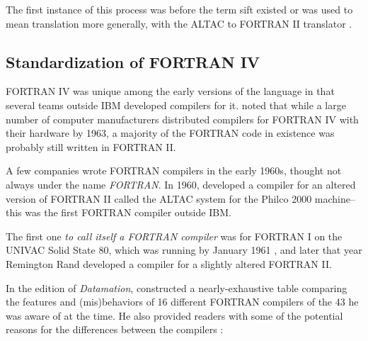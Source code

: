 The first instance of this process was before the term \gls{sift}
existed or was used to mean translation more generally, with
the ALTAC to FORTRAN II translator \cite{olsen_altac_fortranii_translator_1965}.

\subsection{Standardization of FORTRAN IV}

FORTRAN IV was unique among the early versions of the language in that
several teams outside IBM developed compilers for it.
\citeauthor{backus_heising_fortran_1964} noted that while a large number
of computer manufacturers distributed compilers for FORTRAN IV with
their hardware by 1963, a majority of the FORTRAN code in existence
was probably still written in FORTRAN II\cite{backus_heising_fortran_1964}.

A few companies wrote FORTRAN compilers in the early 1960s,
thought not always under the name \textit{FORTRAN}.
In 1960,  developed a compiler for
an altered version of FORTRAN II called the ALTAC system
for the Philco 2000 machine\cite{sammet_programming_languages_history_and_fundamentals_1969}--
this was the first FORTRAN compiler outside IBM.

The first one
\textit{to call itself a FORTRAN compiler} was for FORTRAN I
on the UNIVAC Solid State 80, which was running by January 1961
\cite{sammet_programming_languages_history_and_fundamentals_1969},
and later that year Remington Rand developed a compiler
for a slightly altered FORTRAN II.

In the  edition of \textit{Datamation},
\citeauthor{oswald_various_fortrans_datamation_1964}
constructed a nearly-exhaustive table comparing the features and (mis)behaviors of
16 different FORTRAN compilers of the 43 he was aware of at the time.
He also provided readers with some of the potential reasons for the
differences between the compilers
\cite{oswald_various_fortrans_datamation_1964}:

